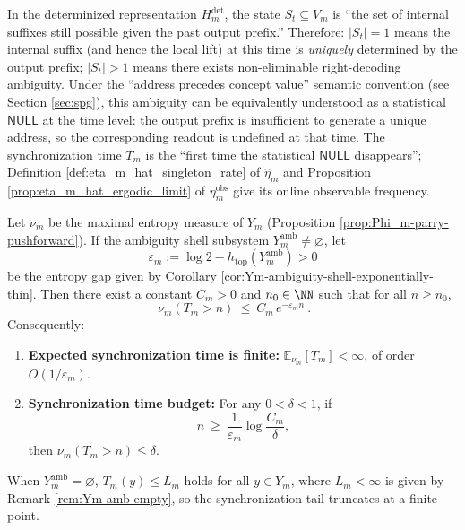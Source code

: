 \begin{remark}\label{rem:Ym-stat-null-unsync}
In the determinized representation \(H_m^{\mathrm{det}}\), the state \(S_t\subseteq V_m\) is ``the set of internal suffixes still possible given the past output prefix.''
Therefore:
\(|S_t|=1\) means the internal suffix (and hence the local lift) at this time is \emph{uniquely} determined by the output prefix;
\(|S_t|>1\) means there exists non-eliminable right-decoding ambiguity.
Under the ``address precedes concept value'' semantic convention (see Section \ref{sec:spg}), this ambiguity can be equivalently understood as a statistical \(\mathsf{NULL}\) at the time level: the output prefix is insufficient to generate a unique address, so the corresponding readout is undefined at that time.
The synchronization time \(T_m\) is the ``first time the statistical \(\mathsf{NULL}\) disappears''; Definition \ref{def:eta_m_hat_singleton_rate} of \(\widehat\eta_m\) and Proposition \ref{prop:eta_m_hat_ergodic_limit} of \(\eta_m^{\mathrm{obs}}\) give its online observable frequency.
\end{remark}

\begin{theorem}\label{thm:Ym-sync-tail}
Let \(\nu_m\) be the maximal entropy measure of \(Y_m\) (Proposition \ref{prop:Phi_m-parry-pushforward}). If the ambiguity shell subsystem \(Y_m^{\mathrm{amb}}\neq\varnothing\), let
\[
\varepsilon_m:=\log 2-h_{\mathrm{top}}(Y_m^{\mathrm{amb}})>0
\]
be the entropy gap given by Corollary \ref{cor:Ym-ambiguity-shell-exponentially-thin}. Then there exist a constant \(C_m>0\) and \(n_0\in\NN\) such that for all \(n\ge n_0\),
\[
\boxed{\ \nu_m(T_m>n)\ \le\ C_m\,e^{-\varepsilon_m n}\ }.
\]
Consequently:
\begin{enumerate}
  \item \textbf{Expected synchronization time is finite:} \(\mathbb{E}_{\nu_m}[T_m]<\infty\), of order \(O(1/\varepsilon_m)\).
  \item \textbf{Synchronization time budget:} For any \(0<\delta<1\), if
  \[
  n\ \ge\ \frac{1}{\varepsilon_m}\log\frac{C_m}{\delta},
  \]
  then \(\nu_m(T_m>n)\le \delta\).
\end{enumerate}
When \(Y_m^{\mathrm{amb}}=\varnothing\), \(T_m(y)\le L_m\) holds for all \(y\in Y_m\), where \(L_m<\infty\) is given by Remark \ref{rem:Ym-amb-empty}, so the synchronization tail truncates at a finite point.
\end{theorem}

